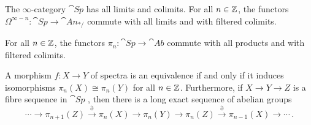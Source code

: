 \begin{lem}\label{lem:HomotopyGroupsOfSpectra}
	\begin{alphanumerate}
		\item \!The $\infty$-category $\cat{Sp}$ has all limits and colimits. For all $n\in\mathbb{Z}$, the functors $\Omega^{\infty-n}\colon \cat{Sp}\rightarrow \cat{An}_{*/}$ commute with all limits and with filtered colimits.\label{enum:SpHasAllColimits}
		\item For all $n\in\mathbb{Z}$, the functors $\pi_n\colon \cat{Sp}\rightarrow \cat{Ab}$ commute with all products  and with filtered colimits.\label{enum:HomotopyGroupsOfSpectraCommuteWithFilteredColimits}
		\item A morphism $f\colon X\rightarrow Y$ of spectra is an equivalence if and only if it induces isomorphisms $\pi_n(X)\cong \pi_n(Y)$ for all $n\in\mathbb{Z}$. Furthermore, if $X\rightarrow Y\rightarrow Z$ is a fibre sequence in $\cat{Sp}$ , then there is a long exact sequence of abelian groups\label{enum:WhiteheadForSpectra}
		\begin{equation*}
			\dotsb\longrightarrow \pi_{n+1}(Z)\overset{\partial}{\longrightarrow} \pi_n(X)\longrightarrow \pi_n(Y)\longrightarrow \pi_n(Z)\overset{\partial}{\longrightarrow} \pi_{n-1}(X)\longrightarrow\dotsb\,.
		\end{equation*}
	\end{alphanumerate}
\end{lem}
